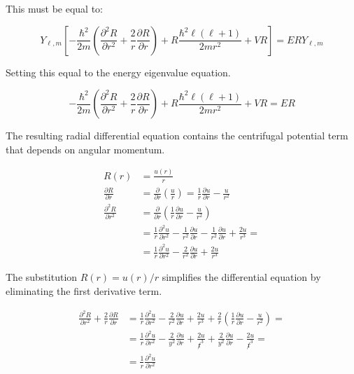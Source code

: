 \documentclass[italian]{HKNdocument}
\begin{document}
This must be equal to:

\begin{equation}
Y_{\ell, m}\left[-\frac{\hbar^{2}}{2 m}\left(\frac{\partial^{2} R}{\partial r^{2}}+\frac{2}{r} \frac{\partial R}{\partial r}\right)+R \frac{\hbar^{2} \ell(\ell+1)}{2 m r^{2}}+V R\right]=E R Y_{\ell, m}
\end{equation}

Setting this equal to the energy eigenvalue equation.

\begin{equation}
-\frac{\hbar^{2}}{2 m}\left(\frac{\partial^{2} R}{\partial r^{2}}+\frac{2}{r} \frac{\partial R}{\partial r}\right)+R \frac{\hbar^{2} \ell(\ell+1)}{2 m r^{2}}+V R=E R
\end{equation}

The resulting radial differential equation contains the centrifugal potential term that depends on angular momentum.

\begin{align}
R(r) & =\frac{u(r)}{r} \\
\frac{\partial R}{\partial r} & =\frac{\partial}{\partial r}\left(\frac{u}{r}\right)=\frac{1}{r} \frac{\partial u}{\partial r}-\frac{u}{r^{2}} \\
\frac{\partial^{2} R}{\partial r^{2}} & =\frac{\partial}{\partial r}\left(\frac{1}{r} \frac{\partial u}{\partial r}-\frac{u}{r^{2}}\right)  \\
& =\frac{1}{r} \frac{\partial^{2} u}{\partial r^{2}}-\frac{1}{r^{2}} \frac{\partial u}{\partial r}-\frac{1}{r^{2}} \frac{\partial u}{\partial r}+\frac{2 u}{r^{3}}= \\
& =\frac{1}{r} \frac{\partial^{2} u}{\partial r^{2}}-\frac{2}{r^{2}} \frac{\partial u}{\partial r}+\frac{2 u}{r^{3}}
\end{align}

The substitution $R(r) = u(r)/r$ simplifies the differential equation by eliminating the first derivative term.

\begin{align}
\frac{\partial^{2} R}{\partial r^{2}}+\frac{2}{r} \frac{\partial R}{\partial r} & =\frac{1}{r} \frac{\partial^{2} u}{\partial r^{2}}-\frac{2}{r^{2}} \frac{\partial u}{\partial r}+\frac{2 u}{r^{3}}+\frac{2}{r}\left(\frac{1}{r} \frac{\partial u}{\partial r}-\frac{u}{r^{2}}\right)= \\
& =\frac{1}{r} \frac{\partial^{2} u}{\partial r^{2}}-\frac{2}{y^{2}} \frac{\partial u}{\partial r}+\frac{2 u}{\not r^{3}}+\frac{2}{y^{2}} \frac{\partial u}{\partial r}-\frac{2 u}{\not r^{3}}=  \\
& =\frac{1}{r} \frac{\partial^{2} u}{\partial r^{2}}
\end{align}
\end{document}
